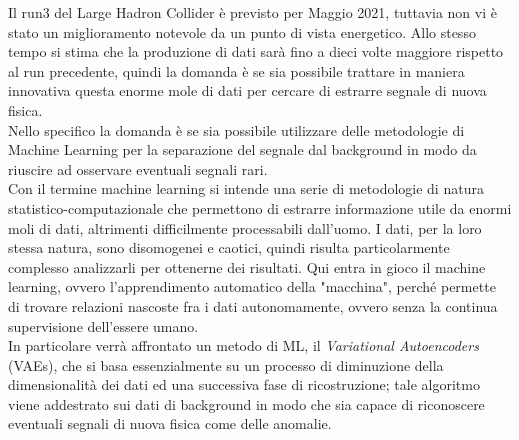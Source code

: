 Il run3 del Large Hadron Collider è previsto per Maggio 2021, tuttavia non vi è stato un miglioramento notevole da un punto di vista energetico. Allo stesso tempo si stima che la produzione di dati sarà fino a dieci volte maggiore rispetto al run precedente, quindi la domanda è se sia possibile trattare in maniera innovativa questa enorme mole di dati per cercare di estrarre segnale di nuova fisica. \\
Nello specifico la domanda è se sia possibile utilizzare delle metodologie di Machine Learning per la separazione del segnale dal background in modo da riuscire ad osservare eventuali segnali rari.\\
Con il termine machine learning si intende una serie di metodologie di natura statistico-computazionale che permettono di estrarre informazione utile da enormi moli di dati, altrimenti difficilmente processabili dall'uomo.
I dati, per la loro stessa natura, sono disomogenei e caotici, quindi risulta particolarmente complesso analizzarli per ottenerne dei risultati. Qui entra in gioco il machine learning, ovvero l'apprendimento automatico della "macchina", perché permette di trovare relazioni nascoste fra i dati autonomamente, ovvero senza la continua supervisione dell'essere umano. \\
In particolare verrà affrontato un metodo di ML, il \textit{Variational Autoencoders} (VAEs), che si basa essenzialmente su un processo di diminuzione della dimensionalità dei dati ed una successiva fase di ricostruzione; tale algoritmo viene addestrato sui dati di background in modo che sia capace di riconoscere eventuali segnali di nuova fisica come delle anomalie.\\


